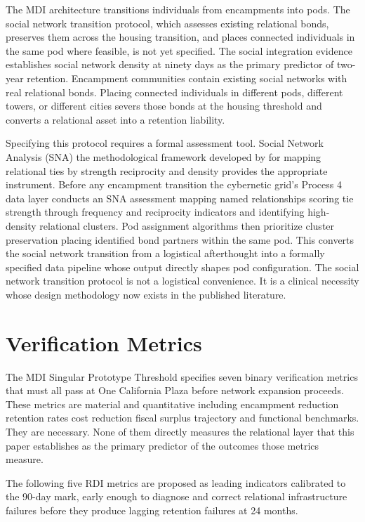\documentclass[12pt, letterpaper]{article}
\begin{document}
The MDI architecture transitions individuals from encampments into pods. The social network transition protocol, which assesses existing relational bonds, preserves them across the housing transition, and places connected individuals in the same pod where feasible, is not yet specified. The social integration evidence establishes social network density at ninety days as the primary predictor of two-year retention. Encampment communities contain existing social networks with real relational bonds. Placing connected individuals in different pods, different towers, or different cities severs those bonds at the housing threshold and converts a relational asset into a retention liability.

Specifying this protocol requires a formal assessment tool. Social Network Analysis (SNA) the methodological framework developed by \citet{wasserman_faust_1994} for mapping relational ties by strength reciprocity and density provides the appropriate instrument. Before any encampment transition the cybernetic grid's Process 4 data layer conducts an SNA assessment mapping named relationships scoring tie strength through frequency and reciprocity indicators and identifying high-density relational clusters. Pod assignment algorithms then prioritize cluster preservation placing identified bond partners within the same pod. This converts the social network transition from a logistical afterthought into a formally specified data pipeline whose output directly shapes pod configuration. The social network transition protocol is not a logistical convenience. It is a clinical necessity whose design methodology now exists in the published literature.

\clearpage
\section{Verification Metrics}

The MDI Singular Prototype Threshold specifies seven binary verification metrics that must all pass at One California Plaza before network expansion proceeds. These metrics are material and quantitative including encampment reduction retention rates cost reduction fiscal surplus trajectory and functional benchmarks. They are necessary. None of them directly measures the relational layer that this paper establishes as the primary predictor of the outcomes those metrics measure.

The following five RDI metrics are proposed as leading indicators calibrated to the 90-day mark, early enough to diagnose and correct relational infrastructure failures before they produce lagging retention failures at 24 months.
\end{document}

